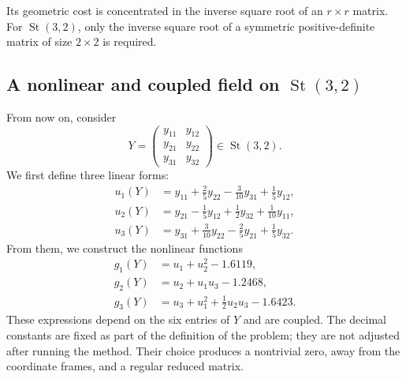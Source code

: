 \documentclass[11pt]{article}
\begin{document}
Its geometric cost is concentrated in the inverse square root of an
$r\times r$ matrix. For $\operatorname{St}(3,2)$, only the inverse square root
of a symmetric positive-definite matrix of size $2\times2$ is required.

\subsection*{A nonlinear and coupled field on $\operatorname{St}(3,2)$}

From now on, consider
\[
    Y=
    \begin{pmatrix}
        y_{11}&y_{12}\\
        y_{21}&y_{22}\\
        y_{31}&y_{32}
    \end{pmatrix}
    \in\operatorname{St}(3,2).
\]
We first define three linear forms:
\begin{align}
    u_1(Y)
    &=
    y_{11}
    +\frac25y_{22}
    -\frac3{10}y_{31}
    +\frac15y_{12},
    \label{eq:u1_stiefel}\\
    u_2(Y)
    &=
    y_{21}
    -\frac15y_{12}
    +\frac12y_{32}
    +\frac1{10}y_{11},
    \label{eq:u2_stiefel}\\
    u_3(Y)
    &=
    y_{31}
    +\frac3{10}y_{22}
    -\frac25y_{21}
    +\frac15y_{32}.
    \label{eq:u3_stiefel}
\end{align}
From them, we construct the nonlinear functions
\begin{align}
    g_1(Y)
    &=
    u_1+u_2^2-1.6119,
    \label{eq:g1_stiefel}\\
    g_2(Y)
    &=
    u_2+u_1u_3-1.2468,
    \label{eq:g2_stiefel}\\
    g_3(Y)
    &=
    u_3+u_1^2+\frac12u_2u_3-1.6423.
    \label{eq:g3_stiefel}
\end{align}
These expressions depend on the six entries of $Y$ and are coupled.
The decimal constants are fixed as part of the definition of the problem;
they are not adjusted after running the method. Their choice produces a
nontrivial zero, away from the coordinate frames, and a regular reduced matrix.
\end{document}
